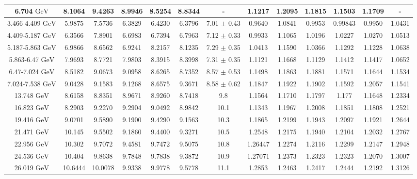 \documentclass[11pt]{article}
\begin{document}
\begin{table}[htbp]
{\begin{tabular}{ccccccccccccc}
				6.704 ${\textrm{GeV}}$ & 8.1064 & 9.4263 & 8.9946 & 8.5254 & 8.8344 & - & 1.1217 & 1.2095 & 1.1815 & 1.1503 & 1.1709 & - \\
				\midrule
				3.466-4.409 ${\textrm{GeV}}$ & 5.9875 & 7.5736 & 6.3829 & 6.4230 & 6.3796 & 7.01 $\pm$ 0.43  & 0.9640 & 1.0841 & 0.9953 & 0.99843 & 0.9950 & 1.0431  \\
				4.409-5.187 ${\textrm{GeV}}$ & 6.3566 & 7.8901 & 6.6983 & 6.7394 & 6.7963 & 7.12 $\pm$ 0.33  & 0.9933 & 1.1065 & 1.0196 & 1.0227 & 1.0270 & 1.0513  \\
				5.187-5.863 ${\textrm{GeV}}$ & 6.9866 & 8.6562 & 6.9241 & 8.2157 & 8.1235 & 7.29 $\pm$ 0.35  & 1.0413 & 1.1590 & 1.0366 & 1.1292 & 1.1228 & 1.0638  \\
				5.863-6.47 ${\textrm{GeV}}$ & 7.9693 & 8.7721 & 7.9803 & 8.3915 & 8.3998 & 7.31 $\pm$ 0.35  & 1.1121 & 1.1668 & 1.1129 & 1.1412 & 1.1417 & 1.0652  \\
				6.47-7.024 ${\textrm{GeV}}$ & 8.5182 & 9.0673 & 9.0958 & 8.6265 & 8.7352 & 8.57 $\pm$ 0.53  & 1.1498 & 1.1863 & 1.1881 & 1.1571 & 1.1644 & 1.1534  \\
				7.024-7.538 ${\textrm{GeV}}$ & 9.0428 & 9.1583 & 9.1268 & 8.6575 & 9.3671 & 8.58 $\pm$ 0.62  & 1.1847 & 1.1922 & 1.1902 & 1.1592 & 1.2057 & 1.1541  \\
				\midrule
				13.748 ${\textrm{GeV}}$ & 8.6158 & 8.8351 & 8.9671 & 8.9260 & 8.7418 & 9.8  & 1.1564 & 1.1710 & 1.1797 & 1.177 & 1.1648 & 1.2334  \\
				16.823 ${\textrm{GeV}}$ & 8.2903 & 9.2270 & 9.2904 & 9.0492 & 8.9842 & 10.1  & 1.1343 & 1.1967 & 1.2008 & 1.1851 & 1.1808 & 1.2521  \\
				19.416 ${\textrm{GeV}}$ & 9.0701 & 9.5890 & 9.1900 & 9.4290 & 9.1563 & 10.3  & 1.1865 & 1.2199 & 1.1943 & 1.2097 & 1.1921 & 1.2644  \\
				21.471 ${\textrm{GeV}}$ & 10.145 & 9.5502 & 9.1860 & 9.4400 & 9.3271 & 10.5  & 1.2548 & 1.2175 & 1.1940 & 1.2104 & 1.2032 & 1.2767  \\
				22.956 ${\textrm{GeV}}$ & 10.302 & 9.7072 & 9.4581 & 9.7472 & 9.5075 & 10.8  & 1.26447 & 1.2274 & 1.2116 & 1.2299 & 1.2147 & 1.2948  \\
				24.536 ${\textrm{GeV}}$ & 10.404 & 9.8638 & 9.7848 & 9.7838 & 9.3872 & 10.9  & 1.27071 & 1.2373 & 1.2323 & 1.2323 & 1.2070 & 1.3007  \\
				26.019 ${\textrm{GeV}}$ & 10.6444 & 10.0078 & 9.9338 & 9.9778 & 9.5778 & 11.1  & 1.2853 & 1.2463 & 1.2417 & 1.2444 & 1.2192 & 1.3126  \\
				\bottomrule
				\bottomrule
			\end{tabular}
}
\end{table}
\end{document}

